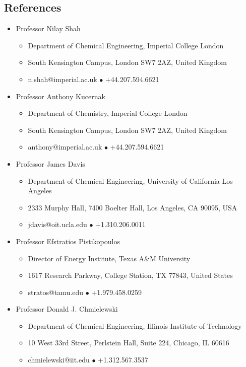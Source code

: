 \documentclass[10pt]{article}
\begin{document}
\subsection{References}
\begin{itemize}
\item Professor Nilay Shah
\begin{itemize}[nosep]
\item Department of Chemical Engineering, Imperial College London
\item South Kensington Campus, London SW7 2AZ, United Kingdom
\item n.shah@imperial.ac.uk \;$\bullet$\; +44.207.594.6621
\end{itemize}

\item Professor Anthony Kucernak
\begin{itemize}[nosep]
\item Department of Chemistry, Imperial College London
\item South Kensington Campus, London SW7 2AZ, United Kingdom
\item anthony@imperial.ac.uk \;$\bullet$\; +44.207.594.6621
\end{itemize}

\item Professor James Davis
\begin{itemize}[nosep]
\item Department of Chemical Engineering, University of California Los Angeles
\item 2333 Murphy Hall, 7400 Boelter Hall, Los Angeles, CA 90095, USA
\item jdavis@oit.ucla.edu \;$\bullet$\; +1.310.206.0011
\end{itemize}

\item Professor Efstratios Pistikopoulos
\begin{itemize}[nosep]
\item  Director of Energy Institute, Texas A\&M University
\item 1617 Research Parkway, College Station, TX 77843, United States
\item stratos@tamu.edu \;$\bullet$\; +1.979.458.0259
\end{itemize}

\item Professor Donald J. Chmielewski
\begin{itemize}[nosep]
\item Department of Chemical Engineering, Illinois Institute of Technology
\item 10 West 33rd Street, Perlstein Hall, Suite 224, Chicago, IL 60616
\item chmielewski@iit.edu \;$\bullet$\;  +1.312.567.3537
\end{itemize}


\end{itemize}
\end{document}

